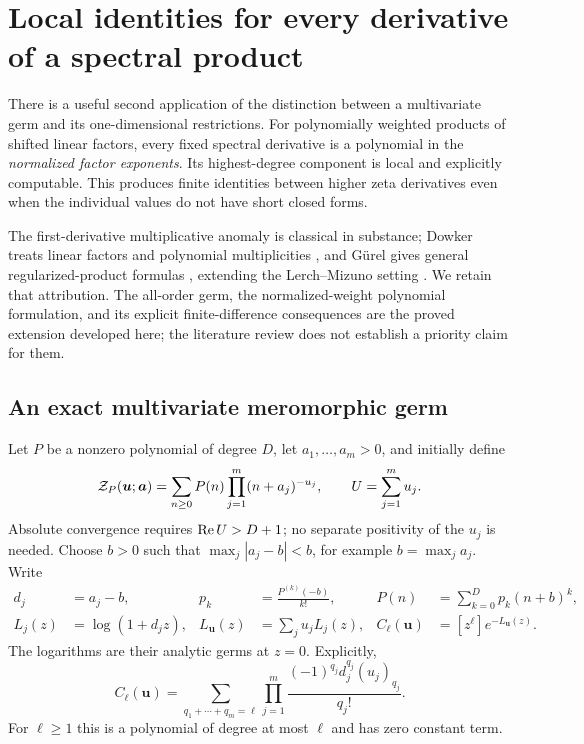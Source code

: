 \section{Local identities for every derivative of a spectral product}
\label{sec:spectral}

There is a useful second application of the distinction between a
multivariate germ and its one-dimensional restrictions. For polynomially
weighted products of shifted linear factors, every fixed spectral
derivative is a polynomial in the \emph{normalized factor exponents}.
Its highest-degree component is local and explicitly computable. This
produces finite identities between higher zeta derivatives even when the
individual values do not have short closed forms.

The first-derivative multiplicative anomaly is classical in substance;
Dowker treats linear factors and polynomial multiplicities
\cite{dowker}, and G\"urel gives general regularized-product formulas
\cite{gurel}, extending the Lerch--Mizuno setting \cite{mizuno}.
We retain that attribution. The all-order germ, the normalized-weight
polynomial formulation, and its explicit finite-difference consequences
are the proved extension developed here; the literature review does not
establish a priority claim for them.

\subsection{An exact multivariate meromorphic germ}

Let $P$ be a nonzero polynomial of degree $D$, let
$a_1,\ldots,a_m>0$, and initially define
\begin{equation}\label{sp:def}
 \mathcal Z_P(\boldsymbol u;\boldsymbol a)
  =\sum_{n\ge0}P(n)\prod_{j=1}^m(n+a_j)^{-u_j},
 \qquad U=\sum_{j=1}^m u_j.
\end{equation}
Absolute convergence requires $\operatorname{Re} U>D+1$; no separate positivity of
the $u_j$ is needed. Choose $b>0$ such that
$\max_j|a_j-b|<b$, for example $b=\max_j a_j$. Write
\begin{align}
 d_j&=a_j-b,& p_k&=\frac{P^{(k)}(-b)}{k!},&
 P(n)&=\sum_{k=0}^D p_k(n+b)^k,\label{sp:base}\\
 L_j(z)&=\log(1+d_jz),&
 L_{\boldsymbol u}(z)&=\sum_j u_jL_j(z),&
 C_\ell(\boldsymbol u)&=[z^\ell]e^{-L_{\boldsymbol u}(z)}.
 \label{sp:C}
\end{align}
The logarithms are their analytic germs at $z=0$. Explicitly,
\begin{equation}\label{sp:Cpoch}
 C_\ell(\boldsymbol u)=
 \sum_{q_1+\cdots+q_m=\ell}
       \prod_{j=1}^m\frac{(-1)^{q_j}d_j^{q_j}(u_j)_{q_j}}{q_j!}.
\end{equation}
For $\ell\ge1$ this is a polynomial of degree at most $\ell$ and has
zero constant term.


